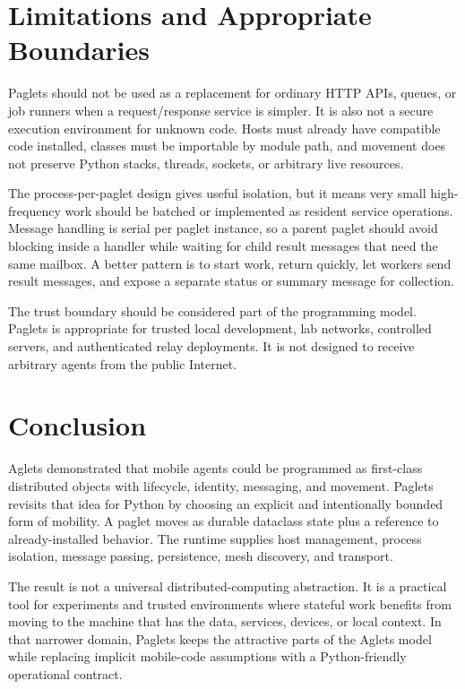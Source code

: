 \documentclass[11pt,a4paper]{article}
\begin{document}
\section{Limitations and Appropriate Boundaries}

Paglets should not be used as a replacement for ordinary HTTP APIs, queues, or
job runners when a request/response service is simpler. It is also not a secure
execution environment for unknown code. Hosts must already have compatible code
installed, classes must be importable by module path, and movement does not
preserve Python stacks, threads, sockets, or arbitrary live resources.

The process-per-paglet design gives useful isolation, but it means very small
high-frequency work should be batched or implemented as resident service
operations. Message handling is serial per paglet instance, so a parent paglet
should avoid blocking inside a handler while waiting for child result messages
that need the same mailbox. A better pattern is to start work, return quickly,
let workers send result messages, and expose a separate status or summary
message for collection.

The trust boundary should be considered part of the programming model. Paglets
is appropriate for trusted local development, lab networks, controlled servers,
and authenticated relay deployments. It is not designed to receive arbitrary
agents from the public Internet.

\section{Conclusion}

Aglets demonstrated that mobile agents could be programmed as first-class
distributed objects with lifecycle, identity, messaging, and movement. Paglets
revisits that idea for Python by choosing an explicit and intentionally
bounded form of mobility. A paglet moves as durable dataclass state plus a
reference to already-installed behavior. The runtime supplies host management,
process isolation, message passing, persistence, mesh discovery, and transport.

The result is not a universal distributed-computing abstraction. It is a
practical tool for experiments and trusted environments where stateful work
benefits from moving to the machine that has the data, services, devices, or
local context. In that narrower domain, Paglets keeps the attractive parts of
the Aglets model while replacing implicit mobile-code assumptions with a
Python-friendly operational contract.



\end{document}
